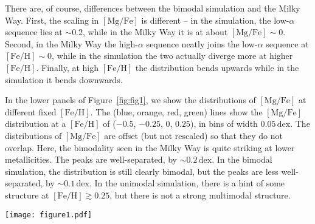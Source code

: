 \documentclass[twocolumn,linenumbers,trackchanges]{aastex631}
\newcommand{\kms}{\ensuremath{\textrm{km}/\textrm{s}}}
\newcommand{\FeH}{\ensuremath{[\textrm{Fe}/\textrm{H}]}}
\newcommand{\MgFe}{\ensuremath{[\textrm{Mg}/\textrm{Fe}]}}
\newcommand{\dex}{\ensuremath{\textrm{dex}}}
\begin{document}
There are, of course, differences between the bimodal simulation and the Milky Way. First, the scaling in \MgFe{} is different -- in the simulation, the low-$\alpha$ sequence lies at $\sim0.2$, while in the Milky Way it is at about $\MgFe\sim0$. Second, in the Milky Way the high-$\alpha$ sequence neatly joins the low-$\alpha$ sequence at $\FeH\sim0$, while in the simulation the two actually diverge more at higher \FeH{}. Finally, at high \FeH{} the distribution bends upwards while in the simulation it bends downwards.

In the lower panels of Figure~\ref{fig:fig1}, we show the distributions of \MgFe{} at different fixed \FeH{}. The (blue, orange, red, green) lines show the \MgFe{} distribution at a \FeH{} of ($-0.5$, $-0.25$, $0$, $0.25$), in bins of width $0.05\,\dex$. The distributions of \MgFe{} are offset (but not rescaled) so that they do not overlap. Here, the bimodality seen in the Milky Way is quite striking at lower metallicities. The peaks are well-separated, by $\sim0.2\,\dex$. In the bimodal simulation, the distribution is still clearly bimodal, but the peaks are less well-separated, by $\sim0.1\,\dex$. In the unimodal simulation, there is a hint of some structure at $\FeH \gtrsim 0.25$, but there is not a strong multimodal structure.
\begin{figure*}
  \centering
  \texttt{[image: figure1.pdf]}
  \caption{The abundance bimodality seen in the Milky Way can be reproduced in some idealized merger simulations. In the upper panels, we show the distribution of stars in the \MgFe{}-\FeH{} plane. The lower panels show the distribution of \MgFe{} at a fixed \FeH{} bin of width $0.05\,\dex$. The colors indicate the fixed \FeH values, which are $-0.5$, $-0.25$, $0$, and $0.25$. The left column shows the observed distribution in the Milky Way from ASPCAP DR17 \citep[][J.A.~Holtzman et al., in preparation]{2016AJ....151..144G}, while the right two columns show two idealized merger simulations. The idealized merger simulations are nearly identical, except that in the bimodal simulation the satellite has a starting \edit1{velocity of $142\,\kms$}, while in the unimodal simulation it has a starting \edit1{velocity of $116\,\kms$}. The labels ``unimodal'' and ``bimodal'' are of the \textit{outcome} of the simulation, and do not reflect a particular choice in the setup. The Milky Way (left column) exhibits a strong bimodal distribution of \MgFe{} at various \FeH{}. The idealized merger simulation marked as bimodal (center column) also exhibits a bimodal distribution of \MgFe{}, though the structure is not as strongly defined. The idealized merger simulation marked as unimodal (right column) exhibits only weak structure, if any at all.}
  \label{fig:fig1}
\end{figure*}
\end{document}

